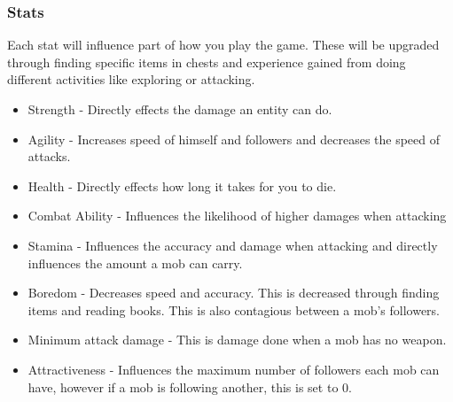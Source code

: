 \documentclass{article}
\begin{document}
            \subsubsection{Stats}
                Each stat will influence part of how you play the game. These will be upgraded through finding specific items in chests and experience gained from doing different activities like exploring or attacking.
                \begin{itemize}
                    \item Strength - Directly effects the damage an entity can do.
                    \item Agility - Increases speed of himself and followers and decreases the speed of attacks.
                    \item Health - Directly effects how long it takes for you to die.
                    \item Combat Ability - Influences the likelihood of higher damages when attacking
                    \item Stamina - Influences the accuracy and damage when attacking and directly influences the amount a mob can carry.
                    \item Boredom - Decreases speed and accuracy. This is decreased through finding items and reading books. This is also contagious between a mob's followers.
                    \item Minimum attack damage - This is damage done when a mob has no weapon.
                    \item Attractiveness - Influences the maximum number of followers each mob can have, however if a mob is following another, this is set to 0.
                \end{itemize}
\end{document}
